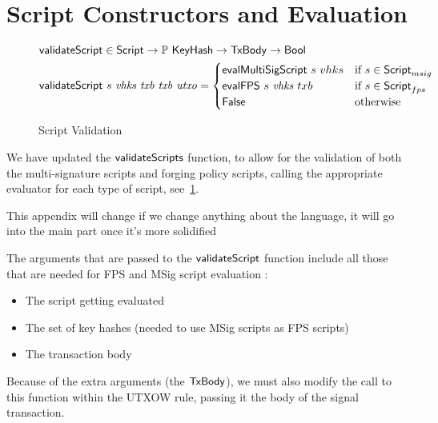 \section{Script Constructors and Evaluation}
\label{sec:mps-lang}


\begin{figure}[htb]
  \begin{align*}
    \mathsf{validateScript} & \in\mathsf{Script}\to
    \mathbb{P}~\mathsf{KeyHash}\to\mathsf{TxBody}\to\mathsf{Bool} \\
    \mathsf{validateScript} & ~s~\mathit{vhks}~\mathit{txb}
     ~\mathit{txb}~\mathit{utxo} =
                           \begin{cases}
                             \mathsf{evalMultiSigScript}~s~vhks & \text{if}~s \in\mathsf{Script}_{msig} \\
                             \mathsf{evalFPS}~s~\mathit{vhks} ~txb & \text{if}~s \in\mathsf{Script}_{fps} \\
                             \mathsf{False} & \text{otherwise}
                           \end{cases}
  \end{align*}
  \caption{Script Validation}
  \label{fig:functions-validate}
\end{figure}

We have updated the
$\mathsf{validateScripts}$ function, to allow for the validation of both the
multi-signature scripts and forging policy scripts, calling the appropriate
evaluator for each type of script, see~\ref{fig:functions-validate}.

\begin{note}
  This appendix will change if we change anything about the language, it will go
  into the main part once it's more solidified
\end{note}

The arguments that are passed to the $\mathsf{validateScript}$ function include all those
that are needed for FPS and MSig script evaluation :

\begin{itemize}
\item The script getting evaluated
\item The set of key hashes (needed to use MSig scripts as FPS scripts)
\item The transaction body
\end{itemize}

Because of the extra arguments
(the $\mathsf{TxBody}$), we must also modify the call to this function
within the UTXOW rule, passing it the body of the signal transaction.

